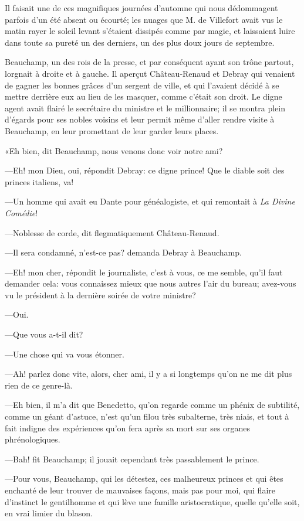 Il faisait une de ces magnifiques journées d'automne qui nous dédommagent parfois d'un été absent ou écourté; les nuages que M. de Villefort avait vus le matin rayer le soleil levant s'étaient dissipés comme par magie, et laissaient luire dans toute sa pureté un des derniers, un des plus doux jours de septembre. 

Beauchamp, un des rois de la presse, et par conséquent ayant son trône partout, lorgnait à droite et à gauche. Il aperçut Château-Renaud et Debray qui venaient de gagner les bonnes grâces d'un sergent de ville, et qui l'avaient décidé à se mettre derrière eux au lieu de les masquer, comme c'était son droit. Le digne agent avait flairé le secrétaire du ministre et le millionnaire; il se montra plein d'égards pour ses nobles voisins et leur permit même d'aller rendre visite à Beauchamp, en leur promettant de leur garder leurs places. 

«Eh bien, dit Beauchamp, nous venons donc voir notre ami? 

—Eh! mon Dieu, oui, répondit Debray: ce digne prince! Que le diable soit des princes italiens, va! 

—Un homme qui avait eu Dante pour généalogiste, et qui remontait à \textit{La Divine Comédie}! 

—Noblesse de corde, dit flegmatiquement Château-Renaud. 

—Il sera condamné, n'est-ce pas? demanda Debray à Beauchamp. 

—Eh! mon cher, répondit le journaliste, c'est à vous, ce me semble, qu'il faut demander cela: vous connaissez mieux que nous autres l'air du bureau; avez-vous vu le président à la dernière soirée de votre ministre? 

—Oui. 

—Que vous a-t-il dit? 

—Une chose qui va vous étonner. 

—Ah! parlez donc vite, alors, cher ami, il y a si longtemps qu'on ne me dit plus rien de ce genre-là. 

—Eh bien, il m'a dit que Benedetto, qu'on regarde comme un phénix de subtilité, comme un géant d'astuce, n'est qu'un filou très subalterne, très niais, et tout à fait indigne des expériences qu'on fera après sa mort sur ses organes phrénologiques. 

—Bah! fit Beauchamp; il jouait cependant très passablement le prince. 

—Pour vous, Beauchamp, qui les détestez, ces malheureux princes et qui êtes enchanté de leur trouver de mauvaises façons, mais pas pour moi, qui flaire d'instinct le gentilhomme et qui lève une famille aristocratique, quelle qu'elle soit, en vrai limier du blason. 


